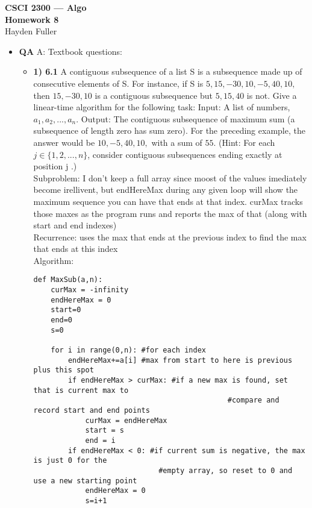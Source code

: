 \documentclass[11pt]{article}
\def\a{\alpha}
\def\b{\beta}
\def\g{\gamma}
\def\d{\delta}
\begin{document}
\thispagestyle{empty}   %


\begin{center}
\large
\textbf{CSCI 2300 --- Algo \\
Homework 8}
\\Hayden Fuller 
\end{center}

\begin{itemize}

\item \textbf{QA} 
A: Textbook questions:
\begin{itemize}
\item \textbf{1) 6.1}
A contiguous subsequence of a list S is a subsequence made up of consecutive elements of S. For instance, if S is $5, 15,-30, 10,-5, 40, 10,$ then $15,-30, 10$ is a contiguous subsequence but $5, 15, 40$ is not. Give a linear-time algorithm for the following task: Input: A list of numbers, $a_1, a_2, . . . , a_n$. Output: The contiguous subsequence of maximum sum (a subsequence of length zero has sum zero). For the preceding example, the answer would be $10,-5, 40, 10,$ with a sum of $55$. (Hint: For each $j \in \{1, 2, . . . , n\}$, consider contiguous subsequences ending exactly at position j .)
\\Subproblem: I don't keep a full array since moost of the values imediately become irellivent, but endHereMax during any given loop will show the maximum sequence you can have that ends at that index. curMax tracks those maxes as the program runs and reports the max of that (along with start and end indexes)
\\Recurrence: uses the max that ends at the previous index to find the max that ends at this index
\\Algorithm:
\begin{verbatim}
def MaxSub(a,n):
    curMax = -infinity
    endHereMax = 0
    start=0
    end=0
    s=0
    
    for i in range(0,n): #for each index
        endHereMax+=a[i] #max from start to here is previous plus this spot
        if endHereMax > curMax: #if a new max is found, set that is current max to 
                                             #compare and record start and end points
            curMax = endHereMax
            start = s
            end = i
        if endHereMax < 0: #if current sum is negative, the max is just 0 for the 
                             #empty array, so reset to 0 and use a new starting point
            endHereMax = 0
            s=i+1


\end{verbatim}
\end{itemize}
\end{itemize}
\end{document}

